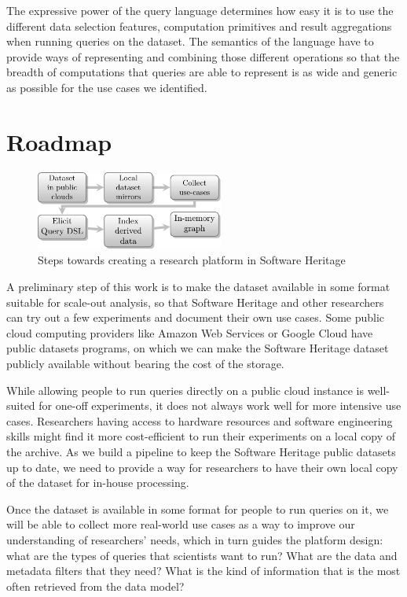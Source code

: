 The expressive power of the query language determines how easy it is to use
the different data selection features, computation primitives and result
aggregations when running queries on the dataset. The semantics of the language
have to provide ways of representing and combining those different operations
so that the breadth of computations that queries are able to represent is as
wide and generic as possible for the use cases we identified.

\section{Roadmap}

\begin{figure}
\begin{center}
    \includegraphics[width=0.55\textwidth]{../img/roadmap}
\end{center}
\caption{Steps towards creating a research platform in Software Heritage}%
\label{fig:roadmap}
\end{figure}

A preliminary step of this work is to make the dataset available in some
format suitable for scale-out analysis, so that Software Heritage and other
researchers can try out a few experiments and document their own use cases.
Some public cloud computing providers like Amazon Web Services or Google Cloud
have public datasets programs, on which we can make the Software Heritage
dataset publicly available without bearing the cost of the storage.

While allowing people to run queries directly on a public cloud instance is
well-suited for one-off experiments, it does not always work well for more intensive
use cases. Researchers having access to hardware resources and software engineering
skills might find it more cost-efficient to run their experiments on a local
copy of the archive. As we build a pipeline to keep the Software Heritage
public datasets up to date, we need to provide a way for researchers to have
their own local copy of the dataset for in-house processing.

Once the dataset is available in some format for people to run queries on it,
we will be able to collect more real-world use cases as a way to improve our
understanding of researchers' needs, which in turn guides the platform design:
what are the types of queries that scientists want to run? What are the data
and metadata filters that they need?  What is the kind of information that is
the most often retrieved from the data model?

